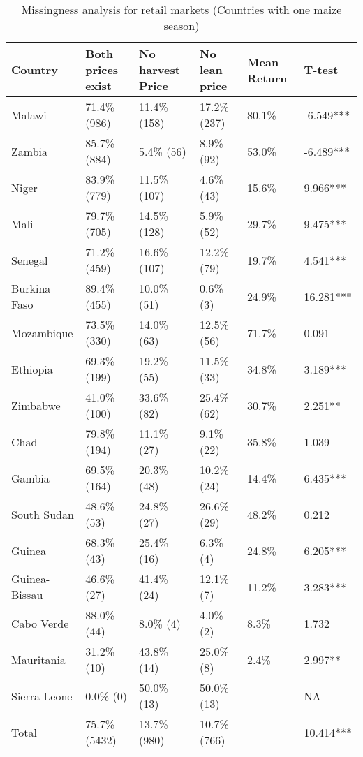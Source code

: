 \begin{table}[ht]
	\centering
	\begin{threeparttable}[t]
		\caption{Missingness analysis for retail markets (Countries with one maize season)}
		\label{tab:missing_1}
		\begin{tabular}{|l|lll|l|l|}
			\hline
			Country & Both prices exist & No harvest Price & No lean price & Mean Return & T-test \\ 
			\hline
Malawi & 71.4\%  (986) & 11.4\% (158) & 17.2\% (237) & 80.1\% & -6.549*** \\ 
  Zambia & 85.7\%  (884) & 5.4\%  (56) & 8.9\%  (92) & 53.0\% & -6.489*** \\ 
  Niger & 83.9\%  (779) & 11.5\% (107) & 4.6\%  (43) & 15.6\% & 9.966*** \\ 
  Mali & 79.7\%  (705) & 14.5\% (128) & 5.9\%  (52) & 29.7\% & 9.475*** \\ 
  Senegal & 71.2\%  (459) & 16.6\% (107) & 12.2\%  (79) & 19.7\% & 4.541*** \\ 
  Burkina Faso & 89.4\%  (455) & 10.0\%  (51) & 0.6\%   (3) & 24.9\% & 16.281*** \\ 
  Mozambique & 73.5\%  (330) & 14.0\%  (63) & 12.5\%  (56) & 71.7\% & 0.091  \\ 
  Ethiopia & 69.3\%  (199) & 19.2\%  (55) & 11.5\%  (33) & 34.8\% & 3.189*** \\ 
  Zimbabwe & 41.0\%  (100) & 33.6\%  (82) & 25.4\%  (62) & 30.7\% & 2.251** \\ 
  Chad & 79.8\%  (194) & 11.1\%  (27) & 9.1\%  (22) & 35.8\% & 1.039  \\ 
  Gambia & 69.5\%  (164) & 20.3\%  (48) & 10.2\%  (24) & 14.4\% & 6.435*** \\ 
  South Sudan & 48.6\%   (53) & 24.8\%  (27) & 26.6\%  (29) & 48.2\% & 0.212  \\ 
  Guinea & 68.3\%   (43) & 25.4\%  (16) & 6.3\%   (4) & 24.8\% & 6.205*** \\ 
  Guinea-Bissau & 46.6\%   (27) & 41.4\%  (24) & 12.1\%   (7) & 11.2\% & 3.283*** \\ 
  Cabo Verde & 88.0\%   (44) & 8.0\%   (4) & 4.0\%   (2) & 8.3\% & 1.732  \\ 
  Mauritania & 31.2\%   (10) & 43.8\%  (14) & 25.0\%   (8) & 2.4\% & 2.997** \\ 
  Sierra Leone & 0.0\%    (0) & 50.0\%  (13) & 50.0\%  (13) &  & NA \\ 
  \hline
  Total & 75.7\% (5432) & 13.7\% (980) & 10.7\% (766) &  & 10.414*** \\ 

\end{tabular}
\end{threeparttable}
\end{table}
